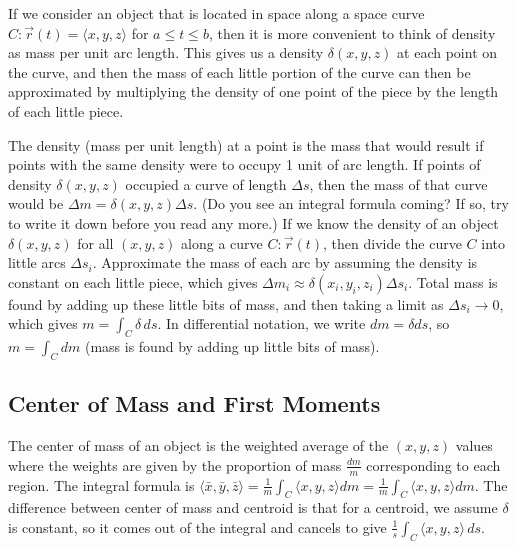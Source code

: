 If we consider an object that is located in space along a space curve
$C\colon\vec r (t)=\langle x,y,z\rangle$ for $a\leq t\leq b$, then it is more
convenient to think of density as mass per unit arc length.  This
gives us a density $\delta(x,y,z)$ at each point on the curve, and then the
mass of each little portion of the curve can then be approximated by
multiplying the density of one point of the piece by the length of
each little piece.

The density  (mass per unit length) at a point is the mass that would
result if points with the same density were to occupy 1 unit of arc
length. If points of density $\delta(x,y,z)$ occupied a curve of length $\Delta
s$, then the mass of that curve would be $\Delta m = \delta(x,y,z)\Delta s$. (Do you
see an integral formula coming? If so, try to write it down before you
read any more.) If we know the density of an object $\delta(x,y,z)$ for 
all $(x,y,z)$ along a curve $C\colon\vec r(t)$, then divide the curve $C$
into little arcs $\Delta s_{i}$. Approximate the mass of each arc by
assuming the density is constant on each little piece, which gives $\Delta
m_{i} \approx \delta(x_i,y_i,z_i)\Delta s_{i}$. Total mass is found by adding up these
little bits of mass, and then taking a limit as $\Delta s_{i}\to 0$, which
gives $m=\int_C \delta \,ds$.  In differential notation, we write $dm = \delta ds$,
 so $m=\int_C dm$ (mass is found by adding up little bits of mass).  

\subsection{Center of Mass and First Moments}
The center of mass of an object is the weighted average of the
$(x,y,z)$ values where the weights are given by the proportion of mass
$\frac{dm}{m}$ corresponding to each region. The integral formula is
$\langle\bar x,\bar y,\bar z\rangle = \frac{1}{m}\int_C
\langle x,y,z\rangle dm = \frac{1}{m}\int_C \langle x,y,z\rangle dm$. The
difference between center of mass and centroid is that for a centroid,
we assume $\delta$ is constant, so it comes out of the integral and cancels to give $\frac 1 s \int_C \langle x,y,z\rangle\,ds$.  


